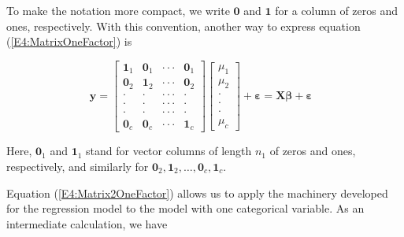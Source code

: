 To make the notation more compact, we write $\mathbf{0}$ and
$\mathbf{1}$ for a column of zeros and ones, respectively. With this
convention, another way to express equation
(\ref{E4:MatrixOneFactor}) is

\begin{center}
\begin{equation}\label{E4:Matrix2OneFactor}
\mathbf{y}=%
\begin{bmatrix}
\mathbf{1}_1 & \mathbf{0}_1 & \cdot \cdot \cdot  & \mathbf{0}%
_1 \\
\mathbf{0}_2 & \mathbf{1}_2 & \cdot \cdot \cdot  & \mathbf{0}%
_2 \\
\cdot  & \cdot  & \cdot \cdot \cdot  & \cdot  \\
\cdot  & \cdot  & \cdot \cdot \cdot  & \cdot  \\
\cdot  & \cdot  & \cdot \cdot \cdot  & \cdot  \\
\mathbf{0}_c & \mathbf{0}_c & \cdot \cdot \cdot  & \mathbf{1}_c
\end{bmatrix}
\begin{bmatrix}
\mu_1 \\
\mu_2 \\
\cdot  \\
\cdot  \\
\cdot  \\
\mu_c%
\end{bmatrix}%
+\boldsymbol \varepsilon =\mathbf{X \boldsymbol \beta +\boldsymbol
\varepsilon }\text{ \ \ \ }
\end{equation}
\end{center}


\noindent Here, $\mathbf{0}_1$ and $\mathbf{1}_1$ stand for vector
columns of
length $n_1$ of zeros and ones, respectively, and similarly for $\mathbf{0}%
_2, \mathbf{1}_2, \ldots, \mathbf{0}_c, \mathbf{1}_c$.

Equation (\ref{E4:Matrix2OneFactor}) allows us to apply the
machinery developed for the regression model to the model with one
categorical variable. As an intermediate calculation, we have

